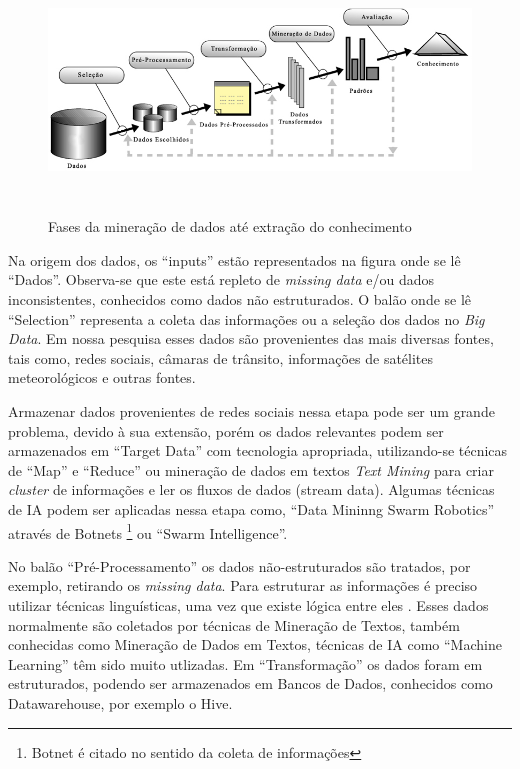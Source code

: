 \begin{figure}[!ht]
\centering
\caption{Fases da mineração de dados até extração do conhecimento}
\includegraphics[width=135mm, height=65mm]{Figuras/BigData/Fayyad.png}
\end{figure}


Na origem dos dados, os ``inputs'' estão representados na figura onde se lê ``Dados''. Observa-se que este está repleto de \textit{missing data} e/ou dados inconsistentes, conhecidos como dados não estruturados. 
O balão onde se lê ``Selection'' representa a coleta das informações ou a seleção dos dados no \textit{Big Data}.
Em nossa pesquisa esses dados são provenientes das mais diversas fontes, tais como, redes sociais, câmaras de trânsito, informações de satélites meteorológicos e outras fontes.

Armazenar dados provenientes de redes sociais nessa etapa pode ser um grande problema, devido à sua extensão, porém os dados relevantes podem ser armazenados em ``Target Data'' 
com tecnologia apropriada, utilizando-se técnicas de ``Map'' e ``Reduce'' ou mineração de dados em textos \textit{Text Mining} para criar \textit{cluster} de informações e ler os fluxos de dados (stream data). 
Algumas técnicas de IA podem ser aplicadas nessa etapa como, ``Data Mininng Swarm Robotics'' através de Botnets \footnote{Botnet é citado no sentido da coleta de informações} ou ``Swarm Intelligence''.

No balão ``Pré-Processamento'' os dados não-estruturados são tratados, por exemplo, retirando os \textit{missing data}. 
Para estruturar as informações é preciso utilizar técnicas linguísticas, uma vez que existe lógica entre eles \cite{Aranha2006}.
Esses dados normalmente são coletados por técnicas de Mineração de Textos, também conhecidas como Mineração de Dados em Textos, técnicas de IA como ``Machine Learning'' 
têm sido muito utlizadas. Em ``Transformação'' os dados foram em estruturados, podendo ser armazenados em Bancos de Dados, conhecidos como Datawarehouse, por exemplo o Hive. 


